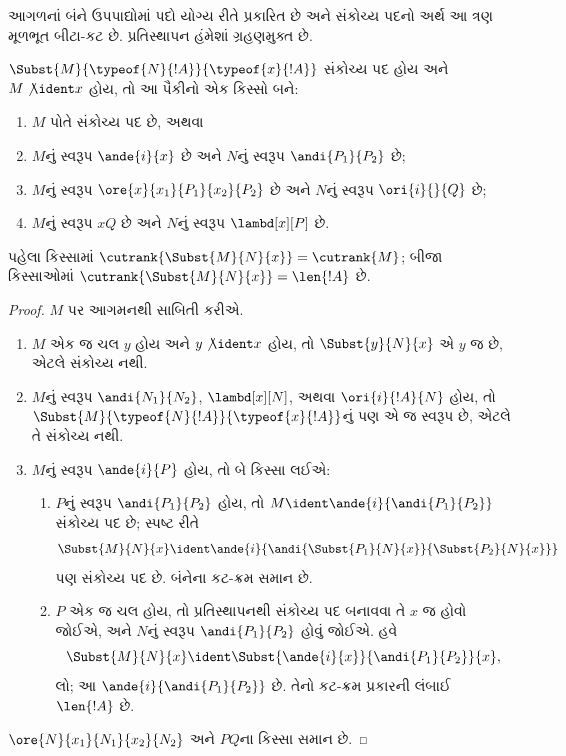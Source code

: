 આગળનાં બંને ઉપપાદ્યોમાં પદો યોગ્ય રીતે પ્રકારિત
છે અને સંકોચ્ય પદનો અર્થ આ ત્રણ મૂળભૂત બીટા-કટ
છે. પ્રતિસ્થાપન હંમેશાં ગ્રહણમુક્ત છે.
\begin{lem}
  $\Subst{M}{\typeof{N}{!A}}{\typeof{x}{!A}}$ સંકોચ્ય પદ
  હોય અને $M \not\ident x$ હોય, તો આ પૈકીનો
  એક કિસ્સો બને:
  \begin{enumerate}
  \item $M$ પોતે સંકોચ્ય પદ છે, અથવા
  \item $M$નું સ્વરૂપ $\ande{i}{x}$ છે અને
    $N$નું સ્વરૂપ $\andi{P_1}{P_2}$ છે;
  \item $M$નું સ્વરૂપ $\ore{x}{x_1}{P_1}{x_2}{P_2}$ છે અને
    $N$નું સ્વરૂપ $\ori{i}{}{Q}$ છે;
  \item $M$નું સ્વરૂપ $x Q$ છે અને
    $N$નું સ્વરૂપ $\lambd[x][P]$ છે.
  \end{enumerate}
  પહેલા કિસ્સામાં $\cutrank{\Subst{M}{N}{x}} = \cutrank{M}$;
  બીજા કિસ્સાઓમાં $\cutrank{\Subst{M}{N}{x}} = \len{!A}$ છે.
\end{lem}
\begin{proof}
  $M$ પર આગમનથી સાબિતી કરીએ.
  \begin{enumerate}
  \item $M$ એક જ ચલ $y$ હોય અને $y \not\ident x$ હોય,
    તો $\Subst{y}{N}{x}$ એ $y$ જ છે, એટલે સંકોચ્ય નથી.
  \item $M$નું સ્વરૂપ $\andi{N_1}{N_2}$, $\lambd[x][N]$,
    અથવા $\ori{i}{!A}{N}$ હોય, તો
    $\Subst{M}{\typeof{N}{!A}}{\typeof{x}{!A}}$નું પણ
    એ જ સ્વરૂપ છે, એટલે તે સંકોચ્ય નથી.
  \item $M$નું સ્વરૂપ $\ande{i}{P}$ હોય, તો બે કિસ્સા લઈએ:
    \begin{enumerate}
      \item $P$નું સ્વરૂપ $\andi{P_1}{P_2}$ હોય, તો
        $M \ident \ande{i}{\andi{P_1}{P_2}}$ સંકોચ્ય પદ છે;
        સ્પષ્ટ રીતે
        \[
        \Subst{M}{N}{x} \ident
        \ande{i}{\andi{\Subst{P_1}{N}{x}}{\Subst{P_2}{N}{x}}}
        \]
        પણ સંકોચ્ય પદ છે. બંનેના કટ-ક્રમ સમાન છે.
      \item $P$ એક જ ચલ હોય, તો પ્રતિસ્થાપનથી સંકોચ્ય
        પદ બનાવવા તે $x$ જ હોવો જોઈએ, અને $N$નું
        સ્વરૂપ $\andi{P_1}{P_2}$ હોવું જોઈએ. હવે
        \[
        \Subst{M}{N}{x} \ident \Subst{\ande{i}{x}}{\andi{P_1}{P_2}}{x},
        \]
        લો; આ $\ande{i}{\andi{P_1}{P_2}}$ છે.
        તેનો કટ-ક્રમ પ્રકારની લંબાઈ $\len{!A}$ છે.
    \end{enumerate}
  \end{enumerate}
  $\ore{N}{x_1}{N_1}{x_2}{N_2}$ અને $P Q$ના કિસ્સા સમાન છે.
  
\end{proof}

